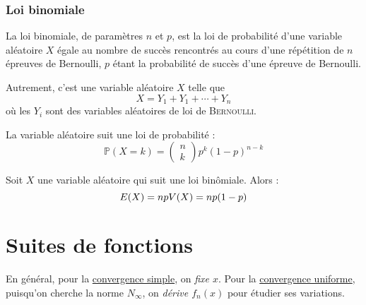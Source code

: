 \documentclass[11pt,a4paper,fleqn,pdftex]{report}
\begin{document}
\subsection{Loi binomiale} %
\label{sub:loi_binomiale}
\begin{dfn}
     La loi binomiale, de paramètres $n$ et $p$, est la loi de probabilité d'une variable aléatoire $X$ égale au nombre de succès rencontrés au cours d'une répétition de $n$ épreuves de Bernoulli, $p$ étant la probabilité de succès d'une épreuve de Bernoulli.\par
     Autrement, c'est une variable aléatoire $X$ telle que 
     \[
         X = Y_1 + Y_1 + \cdots + Y_n
     \]
     où les $Y_i$ sont des variables aléatoires  de loi de \textsc{Bernoulli}.\par
     La variable aléatoire suit une loi de probabilité : 
     \begin{equation}
     \mathbb{P}(X = k) = \begin{pmatrix} n \\ k \end{pmatrix} p^k(1-p)^{n-k}
     \end{equation}
\end{dfn}
\begin{theorem}
     Soit $X$ une variable aléatoire qui suit une loi binômiale. Alors :
     \begin{equation}
     E(X) = np \\ V(X) = np(1-p)
     \end{equation}
\end{theorem}
\chapter{Suites de fonctions}
\begin{methode}
    En général, pour la \uline{convergence simple}, on \emph{fixe $x$}. Pour la \uline{convergence uniforme}, puisqu'on cherche la norme $N_\infty$, on \emph{dérive $f_n(x)$} pour étudier ses variations.
\end{methode}
\end{document}
